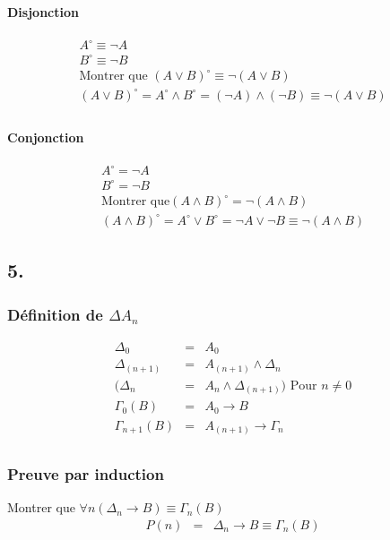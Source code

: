 \documentclass[12pt,a4paper,openany]{report}
\newcommand{\dual}{^\circ}
\begin{document}
		\paragraph{Disjonction}
		\begin{eqnarray*}
			A\dual \equiv \neg A\\%
			B\dual \equiv \neg B\\ %
			\textrm{Montrer que }(A\vee B)\dual \equiv \neg(A \vee B)\\
			(A\vee B)\dual = A\dual \wedge B\dual = (\neg A)\wedge(\neg B) \equiv \neg (A\vee B)\\
		\end{eqnarray*}
		\paragraph{Conjonction}
		\begin{eqnarray*}
			A\dual = \neg A \\
			B\dual = \neg B\\ 
			\textrm{Montrer que} (A\wedge B)\dual = \neg(A \wedge B)\\
			(A\wedge B)\dual = A\dual \vee B\dual = \neg A \vee \neg B \equiv \neg(A\wedge B)
		\end{eqnarray*}

		\subsection{5.}
		\subsubsection{Définition de $\Delta A_n$}
		\begin{eqnarray*}
			\Delta_0 &=& A_0\\
			\Delta_{(n+1)} &=& A_{(n+1)} \wedge \Delta_n\\
			(\Delta_n &=& A_n \wedge \Delta_{(n+1)})\textrm{ Pour }n \neq 0\\
			\Gamma_0(B) &=& A_0 \rightarrow B\\
			\Gamma_{n+1}(B) &=& A_{(n+1)} \rightarrow \Gamma_n\\
		\end{eqnarray*}
		\subsubsection{Preuve par induction}
		Montrer que $\forall n (\Delta_n \rightarrow B) \equiv \Gamma_n (B)$
		\begin{eqnarray*}
			P(n) &=& \Delta_n \rightarrow B \equiv \Gamma_n (B)\\
		\end{eqnarray*}
\end{document}
